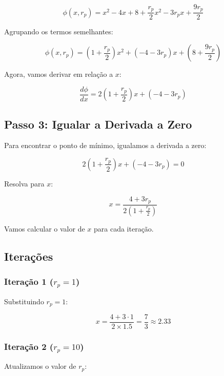 \documentclass[a4paper, 12pt]{article}
\begin{document}
\begin{equation*}
    \phi(x, r_p) = x^2 - 4x + 8 + \frac{r_p}{2} x^2 - 3r_p x + \frac{9r_p}{2}
\end{equation*}

Agrupando os termos semelhantes:

\begin{equation*}
    \phi(x, r_p) = \left(1 + \frac{r_p}{2}\right) x^2 + (-4 - 3r_p) x + \left(8 + \frac{9r_p}{2}\right)
\end{equation*}

Agora, vamos derivar em relação a $x$:

\begin{equation*}
    \frac{d\phi}{dx} = 2 \left(1 + \frac{r_p}{2}\right) x + (-4 - 3r_p)
\end{equation*}

\subsection{Passo 3: Igualar a Derivada a Zero}
Para encontrar o ponto de mínimo, igualamos a derivada a zero:

\begin{equation*}
    2 \left(1 + \frac{r_p}{2}\right) x + (-4 - 3r_p) = 0
\end{equation*}

Resolva para $x$:

\begin{equation*}
    x = \frac{4 + 3r_p}{2 \left(1 + \frac{r_p}{2}\right)}
\end{equation*}

Vamos calcular o valor de $x$ para cada iteração.

\subsection{Iterações}

\subsubsection{Iteração 1 ($r_p = 1$)}
Substituindo $r_p = 1$:

\begin{equation*}
    x = \frac{4 + 3 \cdot 1}{2 \times 1.5} = \frac{7}{3} \approx 2.33
\end{equation*}

\subsubsection{Iteração 2 ($r_p = 10$)}
Atualizamos o valor de $r_p$:
\end{document}
